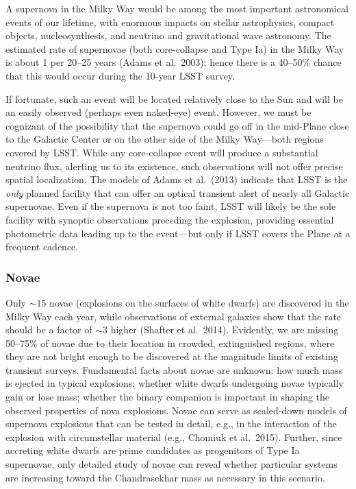 A supernova in the Milky Way would be among the most important astronomical events of our lifetime, with enormous impacts on stellar astrophysics, compact 
objects, nucleosynthesis, and neutrino and gravitational wave astronomy. The estimated rate of supernovae (both core-collapse and Type Ia) in the Milky Way 
is about 1 per 20--25 years (Adams et al.~2003); hence there is a 40--50\% chance that this would occur during the 10-year LSST survey.

If fortunate, such an event will be located relatively close to the Sun and will be an easily observed (perhaps even naked-eye) event. However, we must be 
cognizant of the possibility that the supernova could go off in the mid-Plane close to the Galactic Center or on the other side of the Milky Way---both 
regions covered by LSST. While any core-collapse event will produce a substantial neutrino flux, alerting us to its existence, such observations will not 
offer precise spatial localization. The models of Adams et al.~(2013) indicate that LSST is the \emph{only} planned facility that can offer an optical 
transient alert of nearly all Galactic supernovae. Even if the supernova is not too faint, LSST will likely be the sole facility with synoptic observations 
preceding the explosion, providing essential photometric data leading up to the event---but only if LSST covers the Plane at a frequent cadence.


\subsubsection{Novae}

Only $\sim 15$ novae (explosions on the surfaces of white dwarfs) are discovered in the Milky Way each year, while observations of external galaxies show 
that the rate should be a factor of $\sim 3$ higher (Shafter et al.~2014). Evidently, we are missing 50--75\% of novae due to their location in crowded, 
extinguished regions, where they are not bright enough to be discovered at the magnitude limits of existing transient surveys. Fundamental facts about novae 
are unknown: how much mass is ejected in typical explosions; whether white dwarfs undergoing novae typically gain or lose mass; whether the binary companion 
is important in shaping the observed properties of nova explosions. Novae can serve as scaled-down models of supernova explosions that can be tested in 
detail, e.g., in the interaction of the explosion with circumstellar material (e.g., Chomiuk et al.~2015). Further, since accreting white dwarfs are prime 
candidates as progenitors of Type Ia supernovae, only detailed study of novae can reveal whether particular systems are increasing toward the Chandrasekhar 
mass as necessary in this scenario.

